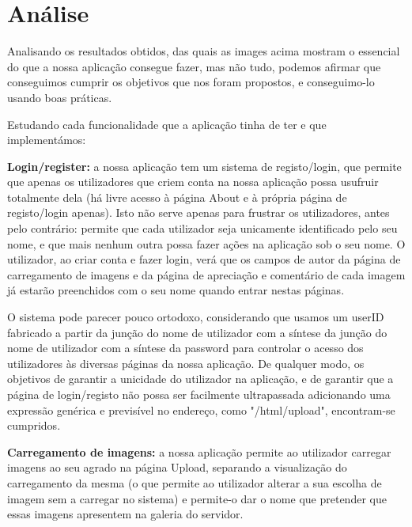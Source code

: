 \documentclass{report}
\begin{document}
    

    

\chapter{Análise}
\label{chap.analise}
Analisando os resultados obtidos, das quais as images acima mostram o essencial do que a nossa aplicação consegue fazer, mas não tudo, podemos afirmar que conseguimos cumprir os objetivos que nos foram propostos, e conseguimo-lo usando boas práticas.

\linebreak
\bigskip

Estudando cada funcionalidade que a aplicação tinha de ter e que implementámos:

\linebreak
\bigskip
\bigskip

    \textbf{Login/register:} a nossa aplicação tem um sistema de registo/login, que permite que apenas os utilizadores que criem conta na nossa aplicação possa usufruir totalmente dela (há livre acesso à página About e à própria página de registo/login apenas). Isto não serve apenas para frustrar os utilizadores, antes pelo contrário: permite que cada utilizador seja unicamente identificado pelo seu nome, e que mais nenhum outra possa fazer ações na aplicação sob o seu nome. O utilizador, ao criar conta e fazer login, verá que os campos de autor da página de carregamento de imagens e da página de apreciação e comentário de cada imagem já estarão preenchidos com o seu nome quando entrar nestas páginas. 
    
    \linebreak
    \bigskip
    
    O sistema pode parecer pouco ortodoxo, considerando que usamos um userID fabricado a partir da junção do nome de utilizador com a síntese da junção do nome de utilizador com a síntese da password para controlar o acesso dos utilizadores às diversas páginas da nossa aplicação. De qualquer modo, os objetivos de garantir a unicidade do utilizador na aplicação, e de garantir que a página de login/registo não possa ser facilmente ultrapassada adicionando uma expressão genérica e previsível no endereço, como "/html/upload", encontram-se cumpridos.
    
    \newpage
    
    \textbf{Carregamento de imagens:} a nossa aplicação permite ao utilizador carregar imagens ao seu agrado na página Upload, separando a visualização do carregamento da mesma (o que permite ao utilizador alterar a sua escolha de imagem sem a carregar no sistema) e permite-o dar o nome que pretender que essas imagens apresentem na galeria do servidor.
    
\end{document}
